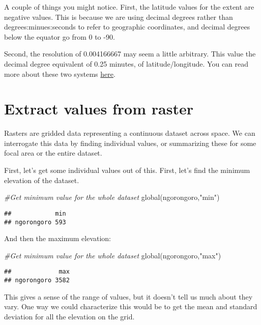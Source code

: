 \documentclass[
]{book}
\newenvironment{Shaded}{\begin{snugshade}}{\end{snugshade}}
\newcommand{\CommentTok}[1]{\textcolor[rgb]{0.56,0.35,0.01}{\textit{#1}}}
\newcommand{\FunctionTok}[1]{\textcolor[rgb]{0.00,0.00,0.00}{#1}}
\newcommand{\NormalTok}[1]{#1}
\newcommand{\StringTok}[1]{\textcolor[rgb]{0.31,0.60,0.02}{#1}}
\begin{document}
A couple of things you might notice. First, the latitude values for the extent are negative values. This is because we are using decimal degrees rather than degrees:minues:seconds to refer to geographic coordinates, and decimal degrees below the equator go from 0 to -90.

Second, the resolution of 0.004166667 may seem a little arbitrary. This value the decimal degree equivalent of 0.25 minutes, of latitude/longitude. You can read more about these two systems \href{https://gisgeography.com/decimal-degrees-dd-minutes-seconds-dms/}{here}.

\hypertarget{extract-values-from-raster}{%
\section{Extract values from raster}\label{extract-values-from-raster}}

Rasters are gridded data representing a continuous dataset across space. We can interrogate this data by finding individual values, or summarizing these for some focal area or the entire dataset.

First, let's get some individual values out of this. First, let's find the minimum elevation of the dataset.

\begin{Shaded}
\begin{Highlighting}[]
\CommentTok{\#Get minimum value for the whole dataset}
\FunctionTok{global}\NormalTok{(ngorongoro,}\StringTok{"min"}\NormalTok{)}
\end{Highlighting}
\end{Shaded}

\begin{verbatim}
##            min
## ngorongoro 593
\end{verbatim}

And then the maximum elevation:

\begin{Shaded}
\begin{Highlighting}[]
\CommentTok{\#Get minimum value for the whole dataset}
\FunctionTok{global}\NormalTok{(ngorongoro,}\StringTok{"max"}\NormalTok{)}
\end{Highlighting}
\end{Shaded}

\begin{verbatim}
##             max
## ngorongoro 3582
\end{verbatim}

This gives a sense of the range of values, but it doesn't tell us much about they vary. One way we could characterize this would be to get the mean and standard deviation for all the elevation on the grid.
\end{document}
